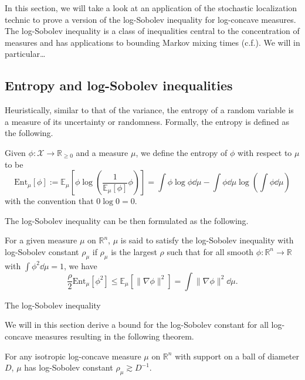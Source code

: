 In this section, we will take a look at an application of the stochastic localization technic 
to prove a version of the log-Sobolev inequality for log-concave measures. The log-Sobolev inequality 
is a class of inequalities central to the concentration of measures and has applications to bounding 
Markov mixing times (c.f.). We will in particular\dots

\subsection{Entropy and log-Sobolev inequalities}

Heuristically, similar to that of the variance, the entropy of a random variable is a measure of its 
uncertainty or randomness. Formally, the entropy is defined as the following.

\begin{definition}[Entropy]
  Given \(\phi : \mathcal{X} \to \mathbb{R}_{\ge 0}\) and a measure \(\mu\), we define the entropy of \(\phi\) 
  with respect to \(\mu\) to be 
  \[\text{Ent}_\mu[\phi] := \mathbb{E}_\mu\left[\phi \log\left(\frac{1}{\mathbb{E}_\mu[\phi]} \phi\right)\right]
   = \int \phi \log \phi \dd \mu - \int \phi \dd \mu \log\left(\int \phi \dd \mu\right)\]
  with the convention that \(0\log 0 = 0\).
\end{definition}
The log-Sobolev inequality can be then formulated as the following.
\begin{definition}
  For a given measure \(\mu\) on \(\mathbb{R}^n\), \(\mu\) is said to satisfy the log-Sobolev inequality with log-Sobolev 
  constant \(\rho_\mu\) if \(\rho_\mu\) is the largest \(\rho\) such that for all smooth 
  \(\phi : \mathbb{R}^n \to \mathbb{R}\) with \(\int \phi^2 \dd \mu = 1\), we have 
  \[\frac{\rho}{2} \text{Ent}_\mu[\phi^2] \le \mathbb{E}_\mu[\|\nabla \phi\|^2] = \int \|\nabla \phi\|^2 \dd \mu.\]
\end{definition}

The log-Sobolev inequality

We will in this section derive a bound for the log-Sobolev constant for all log-concave measures resulting in 
the following theorem. 

\begin{theorem}
  For any isotropic log-concave measure \(\mu\) on \(\mathbb{R}^n\) with support on a ball of diameter \(D\), 
  \(\mu\) has log-Sobolev constant \(\rho_\mu \gtrsim D^{-1}\).
\end{theorem}

